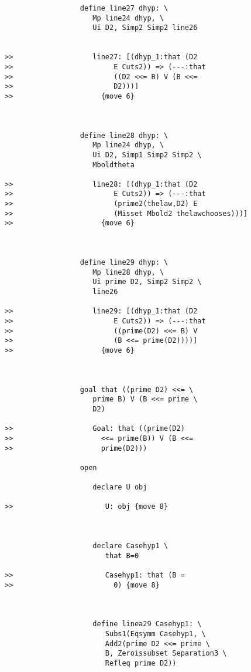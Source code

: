 \documentclass[12pt]{article}
\begin{document}
\begin{verbatim}
                  define line27 dhyp: \
                     Mp line24 dhyp, \
                     Ui D2, Simp2 Simp2 line26


>>                   line27: [(dhyp_1:that (D2
>>                        E Cuts2)) => (---:that
>>                        ((D2 <<= B) V (B <<=
>>                        D2)))]
>>                     {move 6}



                  define line28 dhyp: \
                     Mp line24 dhyp, \
                     Ui D2, Simp1 Simp2 Simp2 \
                     Mboldtheta

>>                   line28: [(dhyp_1:that (D2
>>                        E Cuts2)) => (---:that
>>                        (prime2(thelaw,D2) E
>>                        (Misset Mbold2 thelawchooses)))]
>>                     {move 6}



                  define line29 dhyp: \
                     Mp line28 dhyp, \
                     Ui prime D2, Simp2 Simp2 \
                     line26

>>                   line29: [(dhyp_1:that (D2
>>                        E Cuts2)) => (---:that
>>                        ((prime(D2) <<= B) V
>>                        (B <<= prime(D2))))]
>>                     {move 6}



                  goal that ((prime D2) <<= \
                     prime B) V (B <<= prime \
                     D2)

>>                   Goal: that ((prime(D2)
>>                     <<= prime(B)) V (B <<=
>>                     prime(D2)))

                  open

                     declare U obj

>>                      U: obj {move 8}



                     declare Casehyp1 \
                        that B=0

>>                      Casehyp1: that (B =
>>                        0) {move 8}



                     define linea29 Casehyp1: \
                        Subs1(Eqsymm Casehyp1, \
                        Add2(prime D2 <<= prime \
                        B, Zeroissubset Separation3 \
                        Refleq prime D2))


\end{verbatim}
\end{document}
